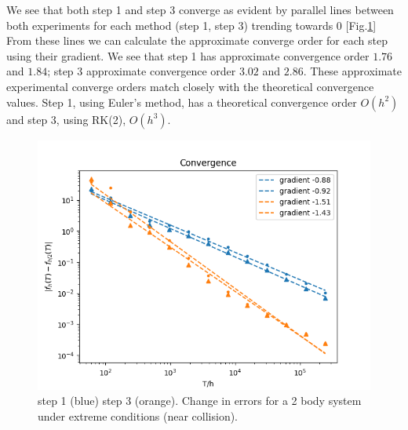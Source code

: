 \documentclass{article}
\begin{document}
We see that both step 1 and step 3 converge as evident by parallel lines between both experiments for each method (step 1, step 3) trending towards 0 [Fig.\ref{fig:convergence}] From these lines we can calculate the approximate converge order for each step using their gradient. We see that step 1 has approximate convergence order $1.76$ and $1.84$; step 3 approximate convergence order $3.02$ and $2.86$. These approximate experimental converge orders match closely with the theoretical convergence values. Step 1, using Euler's method, has a theoretical convergence order $O(h^2)$ and step 3, using RK(2), $O(h^3)$. 


\begin{figure}[h!]
  \begin{center}
  \includegraphics[scale=0.6]{convergence.png}
    \caption{step 1 (blue) step 3 (orange). Change in errors for a 2 body system under extreme conditions (near collision).}
    \label{fig:convergence}
  \end{center}
  \end{figure}


 
\end{document}
